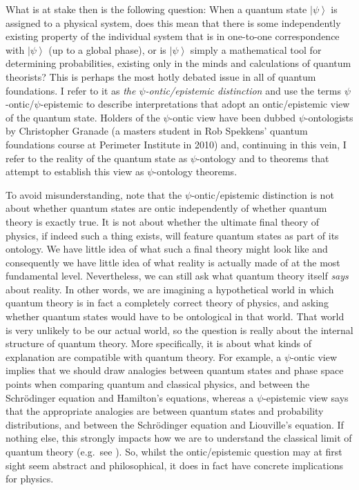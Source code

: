 \documentclass[DIV=calc,paper=a4,fontsize=11pt,twocolumn]{scrartcl} %
\theoremstyle{definition}
\theoremstyle{plain}
\newcommand{\Ket}[1]{\ensuremath{\left \vert #1 \right \rangle}}
\begin{document}
What is at stake then is the following question: When a quantum state
$\Ket{\psi}$ is assigned to a physical system, does this mean that
there is some independently existing property of the individual system
that is in one-to-one correspondence with $\Ket{\psi}$ (up to a global
phase), or is $\Ket{\psi}$ simply a mathematical tool for determining
probabilities, existing only in the minds and calculations of quantum
theorists?  This is perhaps the most hotly debated issue in all of
quantum foundations.  I refer to it as \emph{the
$\psi$-ontic/epistemic distinction} and use the terms
$\psi$-ontic/$\psi$-epistemic to describe interpretations that adopt
an ontic/epistemic view of the quantum state.  Holders of the
$\psi$-ontic view have been dubbed $\psi$-ontologists by Christopher
Granade (a masters student in Rob Spekkens' quantum foundations course
at Perimeter Institute in 2010) and, continuing in this vein, I refer
to the reality of the quantum state as $\psi$-ontology and to theorems
that attempt to establish this view as $\psi$-ontology theorems.

To avoid misunderstanding, note that the $\psi$-ontic/epistemic
distinction is not about whether quantum states are ontic
independently of whether quantum theory is exactly true.  It is not
about whether the ultimate final theory of physics, if indeed such a
thing exists, will feature quantum states as part of its ontology.  We
have little idea of what such a final theory might look like and
consequently we have little idea of what reality is actually made of
at the most fundamental level.  Nevertheless, we can still ask what
quantum theory itself \emph{says} about reality.  In other words, we
are imagining a hypothetical world in which quantum theory is in fact
a completely correct theory of physics, and asking whether quantum
states would have to be ontological in that world.  That world is very
unlikely to be our actual world, so the question is really about the
internal structure of quantum theory.  More specifically, it is about
what kinds of explanation are compatible with quantum theory.  For
example, a $\psi$-ontic view implies that we should draw analogies
between quantum states and phase space points when comparing quantum
and classical physics, and between the Schr{\"o}dinger equation and
Hamilton's equations, whereas a $\psi$-epistemic view says that the
appropriate analogies are between quantum states and probability
distributions, and between the Schr{\"o}dinger equation and
Liouville's equation.  If nothing else, this strongly impacts how we
are to understand the classical limit of quantum theory (e.g.\ see
\cite{Ballentine1994, Emerson2001, Emerson2001a, Emerson2001b}).  So,
whilst the ontic/epistemic question may at first sight seem abstract
and philosophical, it does in fact have concrete implications for
physics.
\end{document}
